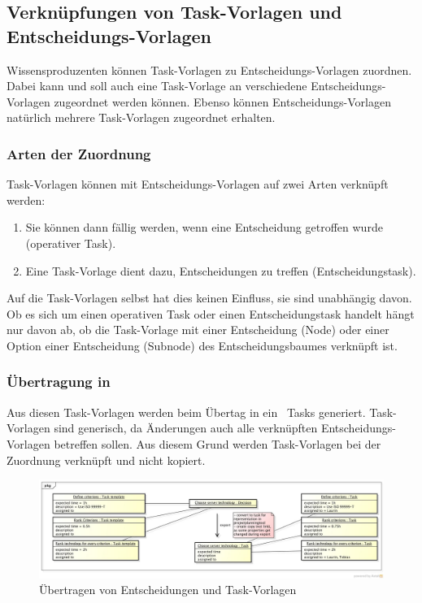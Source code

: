 	
		\subsection{Verknüpfungen von Task-Vorlagen und Entscheidungs-Vorlagen}
			Wissensproduzenten können Task-Vorlagen zu Entscheidungs-Vorlagen zuordnen.
			Dabei kann und soll auch eine Task-Vorlage an verschiedene Entscheidungs-Vorlagen zugeordnet werden können.
			Ebenso können Entscheidungs-Vorlagen natürlich mehrere Task-Vorlagen zugeordnet erhalten.
			
			\subsubsection{Arten der Zuordnung}
				Task-Vorlagen können mit Entscheidungs-Vorlagen auf zwei Arten verknüpft werden:
				\begin{enumerate}
					\item Sie können dann fällig werden, wenn eine Entscheidung getroffen wurde (operativer Task).
					\item Eine Task-Vorlage dient dazu, Entscheidungen zu treffen (Entscheidungstask).
				\end{enumerate}
				Auf die Task-Vorlagen selbst hat dies keinen Einfluss, sie sind unabhängig davon. 
				Ob es sich um einen operativen Task oder einen Entscheidungstask handelt hängt nur davon ab,
				ob die Task-Vorlage mit einer Entscheidung (Node) oder einer Option einer Entscheidung (Subnode) des Entscheidungsbaumes verknüpft ist.

			\subsubsection{Übertragung in \ppt}
				Aus diesen Task-Vorlagen werden beim Übertag in ein \ppt\ Tasks generiert.
				Task-Vorlagen sind generisch, da Änderungen auch alle verknüpften Entscheidungs-Vorlagen betreffen sollen.
				Aus diesem Grund werden Task-Vorlagen bei der Zuordnung verknüpft und nicht kopiert.
				
				\begin{figure}[H]
					\includegraphics[width=\textwidth]{architecture/media/img/DecisionTaskRelation.jpg}
					\centering
					\caption{Übertragen von Entscheidungen und Task-Vorlagen}
					\label{fig:DecisionTaskRelation}
				\end{figure}
				
